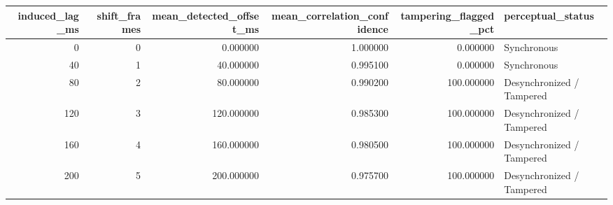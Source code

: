 \begin{tabular}{rrrrrl}
\toprule
induced_lag_ms & shift_frames & mean_detected_offset_ms & mean_correlation_confidence & tampering_flagged_pct & perceptual_status \\
\midrule
0 & 0 & 0.000000 & 1.000000 & 0.000000 & Synchronous \\
40 & 1 & 40.000000 & 0.995100 & 0.000000 & Synchronous \\
80 & 2 & 80.000000 & 0.990200 & 100.000000 & Desynchronized / Tampered \\
120 & 3 & 120.000000 & 0.985300 & 100.000000 & Desynchronized / Tampered \\
160 & 4 & 160.000000 & 0.980500 & 100.000000 & Desynchronized / Tampered \\
200 & 5 & 200.000000 & 0.975700 & 100.000000 & Desynchronized / Tampered \\
\bottomrule
\end{tabular}
